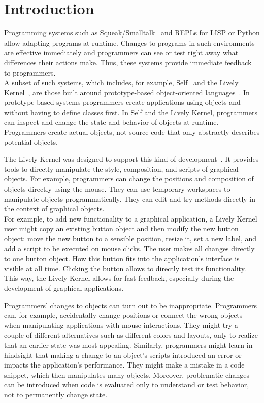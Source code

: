\chapter{Introduction} \label{chapter:INTRODUCTION}

Programming systems such as Squeak/Smalltalk~\cite{Ingalls1997Squeak,GoldbergRobson83} and REPLs for LISP or Python allow adapting programs at runtime.
Changes to programs in such environments are effective immediately and programmers can see or test right away what differences their actions make.
Thus, these systems provide immediate feedback to programmers.\\
A subset of such systems, which includes, for example, Self~\cite{Ungar1987SPS,Ungar2007SEL} and the Lively Kernel~\cite{Ingalls2008LKS,Krahn2009LWD}, are those built around prototype-based object-oriented languages~\cite{Lieberman1986UPO}.
In prototype-based systems programmers create applications using objects and without having to define classes first.
In Self and the Lively Kernel, programmers can inspect and change the state and behavior of objects at runtime.
Programmers create actual objects, not source code that only abstractly describes potential objects.

The Lively Kernel was designed to support this kind of development~\cite{Lincke2013UTW}.
It provides tools to directly manipulate the style, composition, and scripts of graphical objects.
For example, programmers can change the positions and composition of objects directly using the mouse.
They can use temporary workspaces to manipulate objects programmatically.
They can edit and try methods directly in the context of graphical objects.\\
For example, to add new functionality to a graphical application, a Lively Kernel user might copy an existing button object and then modify the new button object: move the new button to a sensible position, resize it, set a new label, and add a script to be executed on mouse clicks.
The user makes all changes directly to one button object.
How this button fits into the application's interface is visible at all time.
Clicking the button allows to directly test its functionality.
This way, the Lively Kernel allows for fast feedback, especially during the development of graphical applications.

Programmers' changes to objects can turn out to be inappropriate.
Programmers can, for example, accidentally change positions or connect the wrong objects when manipulating applications with mouse interactions.
They might try a couple of different alternatives such as different colors and layouts, only to realize that an earlier state was most appealing.
Similarly, programmers might learn in hindsight that making a change to an object's scripts introduced an error or impacts the application's performance.
They might make a mistake in a code snippet, which then manipulates many objects.
Moreover, problematic changes can be introduced when code is evaluated only to understand or test behavior, not to permanently change state.

